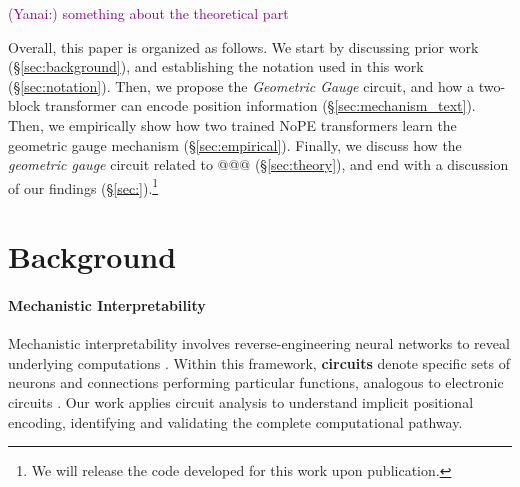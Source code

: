 \documentclass{article}
\newcommand{\ye}[1]{\textcolor{purple}{(Yanai:) #1}}
\theoremstyle{plain}
\theoremstyle{definition}
\theoremstyle{remark}
\begin{document}
\ye{something about the theoretical part}

Overall, this paper is organized as follows. We start by discussing prior work (\S\ref{sec:background}), and establishing the notation used in this work (\S\ref{sec:notation}). Then, we propose the \textit{Geometric Gauge} circuit, and how a two-block transformer can encode position information (\S\ref{sec:mechanism_text}). Then, we empirically show how two trained NoPE transformers learn the geometric gauge mechanism (\S\ref{sec:empirical}).
Finally, we discuss how the \textit{geometric gauge} circuit related to @@@ (\S\ref{sec:theory}), and end with a discussion of our findings (\S\ref{sec:}).\footnote{We will release the code developed for this work upon publication.}



\section{Background}
\label{sec:background }
\label{sec:variance}

\paragraph{Mechanistic Interpretability}
Mechanistic interpretability involves reverse-engineering neural networks to reveal underlying computations \citep{bricken2023monosemanticity, elhage2022toy}. Within this framework, \textbf{circuits} denote specific sets of neurons and connections performing particular functions, analogous to electronic circuits \citep{elhage2021mathematical, olsson2022context, conmy2023towards}. Our work applies circuit analysis to understand implicit positional encoding, identifying and validating the complete computational pathway.
\end{document}
